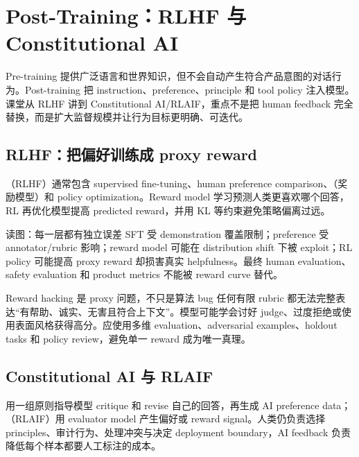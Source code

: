 \section{Post-Training：RLHF 与 Constitutional AI}

Pre-training 提供广泛语言和世界知识，但不会自动产生符合产品意图的对话行为。Post-training 把 instruction、preference、principle 和 tool policy 注入模型。课堂从 RLHF 讲到 Constitutional AI/RLAIF，重点不是把 human feedback 完全替换，而是扩大监督规模并让行为目标更明确、可迭代。

\subsection{RLHF：把偏好训练成 proxy reward}

（RLHF）通常包含 supervised fine-tuning、human preference comparison、（奖励模型）和 policy optimization。Reward model 学习预测人类更喜欢哪个回答，RL 再优化模型提高 predicted reward，并用 KL 等约束避免策略偏离过远。


\begin{knowledgebox}{读图：每一层都有独立误差}
SFT 受 demonstration 覆盖限制；preference 受 annotator/rubric 影响；reward model 可能在 distribution shift 下被 exploit；RL policy 可能提高 proxy reward 却损害真实 helpfulness。最终 human evaluation、safety evaluation 和 product metrics 不能被 reward curve 替代。
\end{knowledgebox}

\begin{warningbox}{Reward hacking 是 proxy 问题，不只是算法 bug}
任何有限 rubric 都无法完整表达“有帮助、诚实、无害且符合上下文”。模型可能学会讨好 judge、过度拒绝或使用表面风格获得高分。应使用多维 evaluation、adversarial examples、holdout tasks 和 policy review，避免单一 reward 成为唯一真理。
\end{warningbox}

\subsection{Constitutional AI 与 RLAIF}

 用一组原则指导模型 critique 和 revise 自己的回答，再生成 AI preference data；（RLAIF）用 evaluator model 产生偏好或 reward signal。人类仍负责选择 principles、审计行为、处理冲突与决定 deployment boundary，AI feedback 负责降低每个样本都要人工标注的成本。

